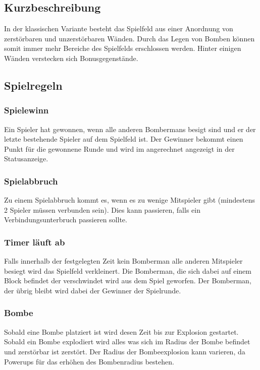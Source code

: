 \documentclass[11pt]{scrartcl}
\begin{document}
\subsection{Kurzbeschreibung}
\label{Kurzbeschreibung}
In der klassischen Variante besteht das Spielfeld aus einer Anordnung 
von zerstörbaren und unzerstörbaren Wänden. 
Durch das Legen von Bomben können somit immer mehr 
Bereiche des Spielfelds erschlossen werden. Hinter einigen 
Wänden verstecken sich Bonusgegenstände.\cite{Bomberman Spielprinzip}

\subsection{Spielregeln}
\label{sec:Spielregeln}

\subsubsection{Spielewinn}
\label{sec:Spielgewinn}
Ein Spieler hat gewonnen, wenn alle anderen Bombermans besigt sind und er der letzte bestehende Spieler auf dem Spielfeld ist.
Der Gewinner bekommt einen Punkt für die gewonnene Runde und wird im angerechnet angezeigt in der Statusanzeige.

\subsubsection{Spielabbruch}
\label{sec:Spielabbruch}
Zu einem Spielabbruch kommt es, wenn es zu wenige Mitspieler gibt (mindestens 2 Spieler müssen verbunden sein).
Dies kann passieren, falls ein Verbindungsunterbruch passieren sollte.

\subsubsection{Timer läuft ab}
\label{sec:Timer läuft ab}
Falls innerhalb der festgelegten Zeit kein Bomberman alle anderen Mitspieler besiegt wird das Spielfeld verkleinert.
Die Bomberman, die sich dabei auf einem Block befindet der \grqq{}verschwindet\grqq{} wird aus dem Spiel geworfen.
Der Bomberman, der übrig bleibt wird dabei der Gewinner der Spielrunde.

\subsubsection{Bombe}
\label{sec:Bombe}
Sobald eine Bombe platziert ist wird desen \grqq{}Zeit bis zur Explosion gestartet\grqq{}.
Sobald ein Bombe explodiert wird alles was sich im Radius der Bombe befindet und zerstörbar ist zerstört.
Der Radius der Bombeexplosion kann varieren, da Powerups für das erhöhen des Bombenradius bestehen.
\end{document}
